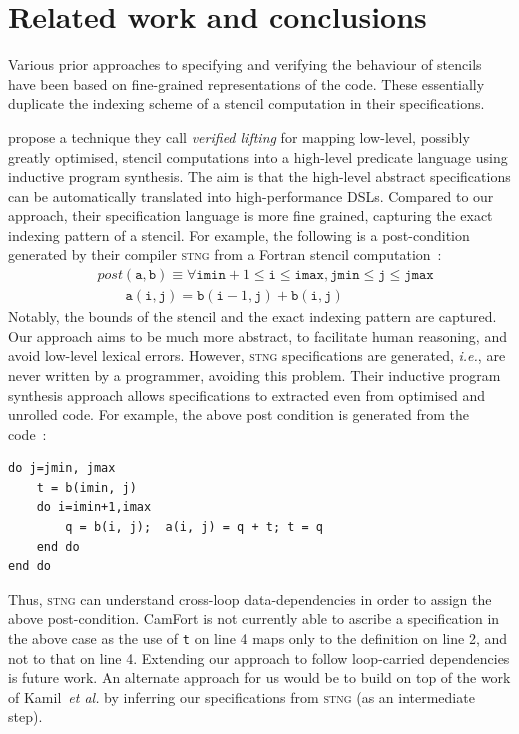 \documentclass[9pt,preprint]{sigplanconf}
\theoremstyle{definition}
\newcommand{\ie}{\emph{i.e.}}
\begin{document}
\section{Related work and conclusions}
\label{sec:discussion}

Various prior approaches to specifying and verifying the behaviour
of stencils have been based on fine-grained representations of the
code. These essentially duplicate the indexing scheme of a stencil
computation in their specifications.

\citet{kamil2016verified} propose a technique they call
\emph{verified lifting} for mapping low-level, possibly
greatly optimised, stencil computations into a high-level
predicate language using inductive program synthesis.
The aim is that the high-level abstract specifications can
be automatically translated into high-performance DSLs. Compared to our approach,
their specification language is more fine grained, capturing
the exact indexing pattern of a stencil. For example, the following
is a post-condition generated by their
compiler \textsc{stng} from a Fortran stencil computation~\cite [p.3]{kamil2016verified}:
%
\begin{align*}
& \textit{post}(\texttt{a}, \texttt{b}) \equiv \forall \texttt{imin}+1
\leq \texttt{i} \leq \texttt{imax}, \texttt{jmin} \leq \texttt{j} \leq
\texttt{jmax} \\
& \qquad \texttt{a}(\texttt{i},\texttt{j}) =
\texttt{b}(\texttt{i}-1,\texttt{j}) + \texttt{b}(\texttt{i},\texttt{j})
\end{align*}
%
Notably, the bounds of the stencil and the exact indexing pattern
are captured. Our approach aims to be much more abstract, to
facilitate human reasoning, and avoid low-level lexical
errors. However, \textsc{stng} specifications are generated, \ie{},
are never written by a programmer, avoiding this
problem. Their inductive program synthesis approach allows
specifications to extracted even from optimised and unrolled code. For
example, the above post condition is generated from the code~\cite [p.3]{kamil2016verified}:
%
\begin{verbatim}
do j=jmin, jmax
    t = b(imin, j)
    do i=imin+1,imax
        q = b(i, j);  a(i, j) = q + t; t = q
    end do
end do
\end{verbatim}
%
Thus, \textsc{stng} can understand cross-loop data-dependencies
in order to assign the above post-condition. CamFort is not currently
able to ascribe a specification in the above case as the use of
\texttt{t} on line 4 maps only to the definition on line 2, and not to
that on line 4. Extending our approach to follow loop-carried dependencies is
future work. An alternate approach for us would be to build on top of
the work of Kamil~\emph{et al.} by inferring our specifications from
\textsc{stng} (as an intermediate step).
\end{document}
